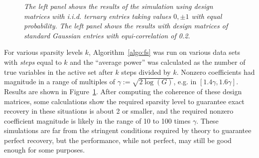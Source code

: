 \documentclass{imsart}
\begin{document}
\begin{figure}
\begin{center}
\hspace{-15pt}
\caption{\small \it The left panel shows the results of the simulation
  using design matrices with i.i.d. ternary entries taking values $0,
  \pm 1$ with equal probability. The left panel shows the results
  with design matrices of standard Gaussian entries with
  equi-correlation of 0.2. }
\label{fig:fwdstepsim}
\end{center}
\end{figure}

For various sparsity levels $k$, Algorithm~\ref{algo:fs} was run on
various data sets with \textit{steps} equal to $k$ and the ``average
power'' was calculated as the number of true variables in the active
set after $k$ steps divided by $k$. Nonzero coefficients had magnitude
in a range of multiples of $\gamma := \sqrt{2\log(G)}$, e.g. in $[1.4
\gamma, 1.6 \gamma]$. Results are shown in
Figure~\ref{fig:fwdstepsim}. After computing the
coherence of these design matrices, some calculations show the required
sparsity level to guarantee exact recovery in these situations is
about 2 or smaller, and the required nonzero coefficient magnitude is
likely in the range of 10 to 100 times $\gamma$. These simulations are far
from the stringent conditions required by theory to guarantee perfect
recovery, but the performance, while not perfect, may still be good
enough for some purposes.
\end{document}
